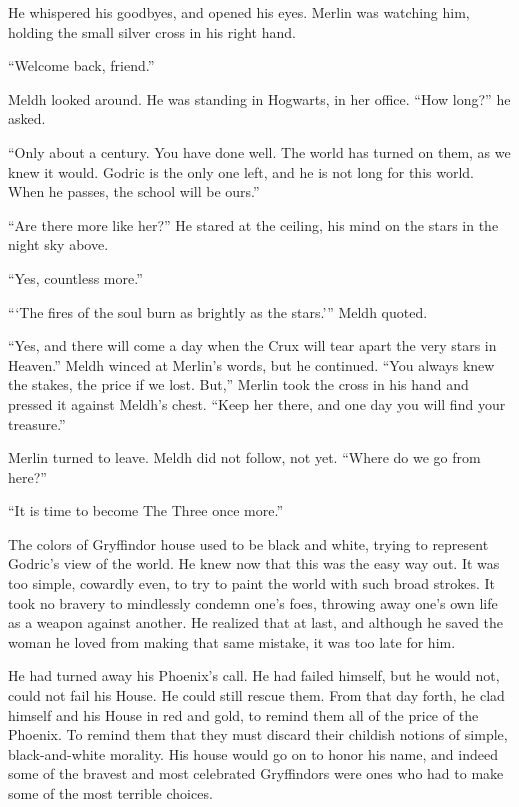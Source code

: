 He whispered his goodbyes, and opened his eyes.
\simpleline
Merlin was watching him, holding the small silver cross in his right hand.

“Welcome back, friend.”

Meldh looked around. He was standing in Hogwarts, in her office. “How long?” he asked.

“Only about a century. You have done well. The world has turned on them, as we knew it would. Godric is the only one left, and he is not long for this world. When he passes, the school will be ours.”

“Are there more like her?” He stared at the ceiling, his mind on the stars in the night sky above.

“Yes, countless more.”

“‘The fires of the soul burn as brightly as the stars.'” Meldh quoted.

“Yes, and there will come a day when the Crux will tear apart the very stars in Heaven.” Meldh winced at Merlin’s words, but he continued. “You always knew the stakes, the price if we lost. But,” Merlin took the cross in his hand and pressed it against Meldh’s chest. “Keep her there, and one day you will find your treasure.”

Merlin turned to leave. Meldh did not follow, not yet. “Where do we go from here?”

“It is time to become The Three once more.”

\simpleline

The colors of Gryffindor house used to be black and white, trying to represent Godric’s view of the world. He knew now that this was the easy way out. It was too simple, cowardly even, to try to paint the world with such broad strokes. It took no bravery to mindlessly condemn one’s foes, throwing away one’s own life as a weapon against another. He realized that at last, and although he saved the woman he loved from making that same mistake, it was too late for him.

He had turned away his Phoenix’s call. He had failed himself, but he would not, could not fail his House. He could still rescue them. From that day forth, he clad himself and his House in red and gold, to remind them all of the price of the Phoenix. To remind them that they must discard their childish notions of simple, black-and-white morality. His house would go on to honor his name, and indeed some of the bravest and most celebrated Gryffindors were ones who had to make some of the most terrible choices.

